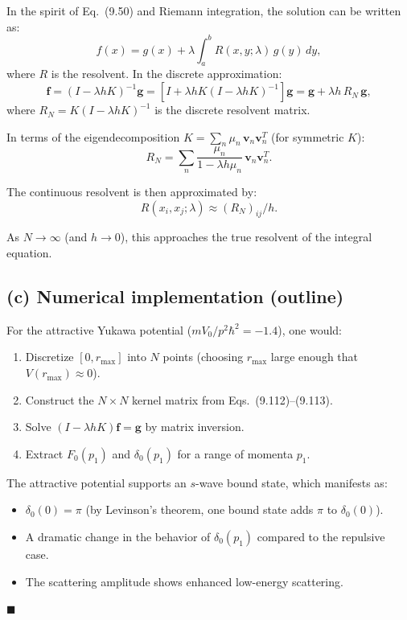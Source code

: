 \documentclass[12pt]{article}
\begin{document}
In the spirit of Eq.~(9.50) and Riemann integration, the solution can be written as:
\[
f(x) = g(x) + \lambda\int_a^b R(x,y;\lambda)\,g(y)\,dy,
\]
where $R$ is the resolvent. In the discrete approximation:
\[
\mathbf{f} = (I - \lambda h K)^{-1}\mathbf{g} = \left[I + \lambda h K(I - \lambda h K)^{-1}\right]\mathbf{g} = \mathbf{g} + \lambda h\,R_N\,\mathbf{g},
\]
where $R_N = K(I - \lambda h K)^{-1}$ is the discrete resolvent matrix.

In terms of the eigendecomposition $K = \sum_n \mu_n\,\mathbf{v}_n\mathbf{v}_n^T$ (for symmetric $K$):
\[
R_N = \sum_n \frac{\mu_n}{1 - \lambda h \mu_n}\,\mathbf{v}_n\mathbf{v}_n^T.
\]

The continuous resolvent is then approximated by:
\[
R(x_i, x_j; \lambda) \approx (R_N)_{ij}/h.
\]

As $N \to \infty$ (and $h \to 0$), this approaches the true resolvent of the integral equation.

\subsection*{(c) Numerical implementation (outline)}

For the attractive Yukawa potential ($mV_0/p^2\hbar^2 = -1.4$), one would:
\begin{enumerate}
\item Discretize $[0, r_{\max}]$ into $N$ points (choosing $r_{\max}$ large enough that $V(r_{\max}) \approx 0$).
\item Construct the $N \times N$ kernel matrix from Eqs.~(9.112)--(9.113).
\item Solve $(I - \lambda h K)\mathbf{f} = \mathbf{g}$ by matrix inversion.
\item Extract $F_0(p_1)$ and $\delta_0(p_1)$ for a range of momenta $p_1$.
\end{enumerate}

The attractive potential supports an $s$-wave bound state, which manifests as:
\begin{itemize}
\item $\delta_0(0) = \pi$ (by Levinson's theorem, one bound state adds $\pi$ to $\delta_0(0)$).
\item A dramatic change in the behavior of $\delta_0(p_1)$ compared to the repulsive case.
\item The scattering amplitude shows enhanced low-energy scattering.
\end{itemize}

\hfill $\blacksquare$
\end{document}
